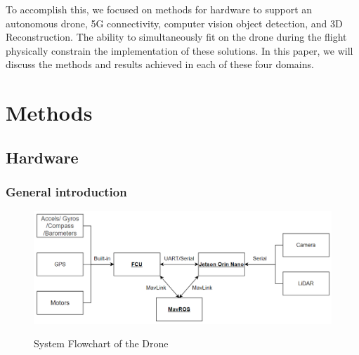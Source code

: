 \documentclass[conference]{IEEEtran}
\begin{document}
To accomplish this, we focused on methods for hardware to support an autonomous drone, 5G connectivity, computer vision object detection, and 3D Reconstruction. The ability to simultaneously fit on the drone during the flight physically constrain the implementation of these solutions. In this paper, we will discuss the methods and results achieved in each of these four domains. 


\section{Methods}

\subsection{Hardware}
\subsubsection{General introduction}
\begin{figure}[h]
    \centering
    {\includegraphics[scale=0.3]{figures/flowchart.png}}
    \caption{System Flowchart of the Drone}
    \label{Stepper Motor}
\end{figure}
\end{document}
